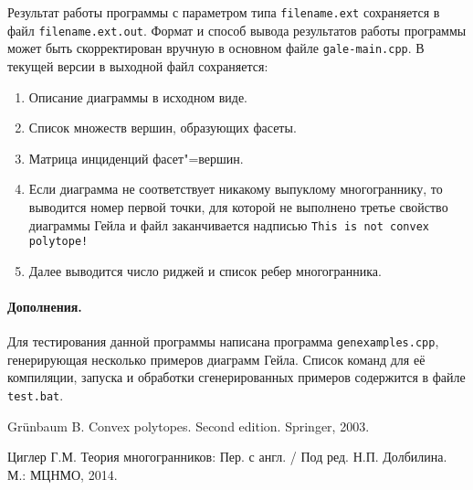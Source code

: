 \documentclass[12pt]{article}
\begin{document}
Результат работы программы с параметром типа \texttt{filename.ext} сохраняется в файл \texttt{filename.ext.out}. Формат и способ вывода результатов работы программы может быть скорректирован вручную в основном файле \texttt{gale-main.cpp}. В текущей версии в выходной файл сохраняется:
\begin{enumerate}
	\item Описание диаграммы в исходном виде.
	\item Список множеств вершин, образующих фасеты.
	\item Матрица инциденций фасет"=вершин.
	\item Если диаграмма не соответствует никакому выпуклому многограннику, то выводится номер первой точки, для которой не выполнено третье свойство диаграммы Гейла и файл заканчивается надписью	\texttt{This is not convex polytope!}
	\item Далее выводится число риджей и список ребер многогранника.
\end{enumerate}  

\paragraph{Дополнения.}
Для тестирования данной программы написана программа \texttt{genexamples.cpp}, генерирующая несколько примеров диаграмм Гейла. Список команд для её компиляции, запуска и обработки сгенерированных примеров содержится в файле \texttt{test.bat}.

\begin{thebibliography}{9}
    
Gr\"unbaum B.
Convex polytopes. Second edition.
Springer, 2003. 
 
Циглер Г.М. 
Теория многогранников: Пер. с англ. / Под ред. Н.П. Долбилина. М.: МЦНМО, 2014. 

\end{thebibliography}
\end{document}

